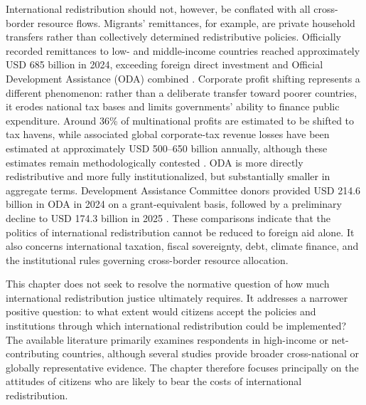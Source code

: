 \documentclass[11pt,a4paper]{article}
\begin{document}
International redistribution should not, however, be conflated with all cross-border resource flows. Migrants' remittances, for example, are private household transfers rather than collectively determined redistributive policies. Officially recorded remittances to low- and middle-income countries reached approximately USD 685 billion in 2024, exceeding foreign direct investment and Official Development Assistance (ODA) combined \citep{ratha_remittances_2024}. Corporate profit shifting represents a different phenomenon: rather than a deliberate transfer toward poorer countries, it erodes national tax bases and limits governments' ability to finance public expenditure. Around 36\% of multinational profits are estimated to be shifted to tax havens, while associated global corporate-tax revenue losses have been estimated at approximately USD 500--650 billion annually, although these estimates remain methodologically contested \citep{torslov_missing_2023, cobham_global_2018}. ODA is more directly redistributive and more fully institutionalized, but substantially smaller in aggregate terms. Development Assistance Committee donors provided USD 214.6 billion in ODA in 2024 on a grant-equivalent basis, followed by a preliminary decline to USD 174.3 billion in 2025 \citep{oecd_final_oda_2025, oecd_preliminary_oda_2026}. %
These comparisons indicate that the politics of international redistribution cannot be reduced to foreign aid alone. It also concerns international taxation, fiscal sovereignty, debt, climate finance, and the institutional rules governing cross-border resource allocation.

This chapter does not seek to resolve the normative question of how much international redistribution justice ultimately requires. %
It addresses a narrower positive question: to what extent would %
citizens %
accept the policies and institutions through which international redistribution could be implemented? The available literature primarily examines respondents in high-income or net-contributing countries, although several studies provide broader cross-national or globally representative evidence. The chapter therefore focuses principally on the attitudes of citizens who are likely to bear %
the %
costs of international redistribution.
\end{document}
